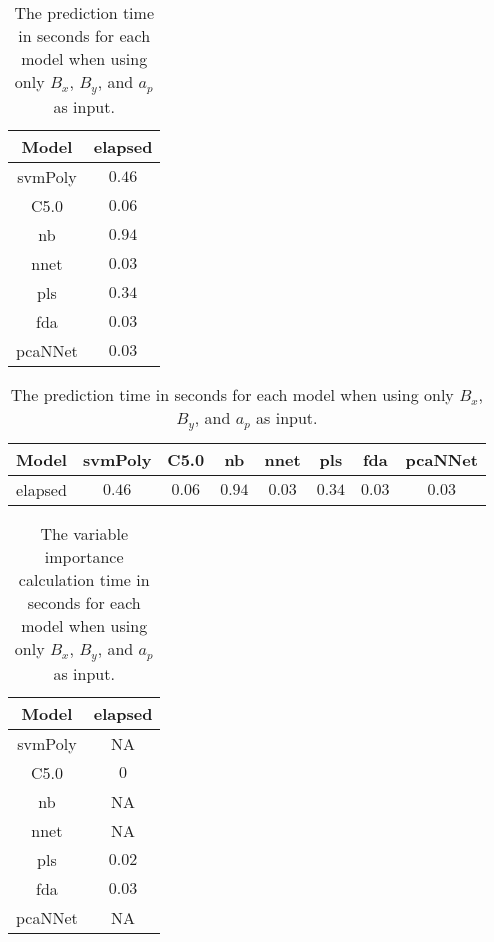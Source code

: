 \begin{table}[!ht]
	\centering
	\begin{tabular}{|c|c|}
		\hline
		Model & elapsed \\ \hline
		svmPoly & $0.46$ \\ \hline
		C5.0 & $0.06$ \\ \hline
		nb & $0.94$ \\ \hline
		nnet & $0.03$ \\ \hline
		pls & $0.34$ \\ \hline
		fda & $0.03$ \\ \hline
		pcaNNet & $0.03$ \\ \hline
	\end{tabular}
	\caption{The prediction time in seconds for each model when using only $B_{x}$, $B_{y}$, and $a_{p}$ as input.}
	\label{tab:time:xyap:predict}
\end{table}

\begin{table}[!ht]
	\centering
	\begin{tabular}{|c|c|c|c|c|c|c|c|}
		\hline
		Model & svmPoly & C5.0 & nb & nnet & pls & fda & pcaNNet \\ \hline
		elapsed & $0.46$ & $0.06$ & $0.94$ & $0.03$ & $0.34$ & $0.03$ & $0.03$ \\ \hline
	\end{tabular}
	\caption{The prediction time in seconds for each model when using only $B_{x}$, $B_{y}$, and $a_{p}$ as input.}
	\label{tab:time:reverse:xyap:predict}
\end{table}

\begin{table}[!ht]
	\centering
	\begin{tabular}{|c|c|}
		\hline
		Model & elapsed \\ \hline
		svmPoly & NA \\ \hline
		C5.0 & $0$ \\ \hline
		nb & NA \\ \hline
		nnet & NA \\ \hline
		pls & $0.02$ \\ \hline
		fda & $0.03$ \\ \hline
		pcaNNet & NA \\ \hline
	\end{tabular}
	\caption{The variable importance calculation time in seconds for each model when using only $B_{x}$, $B_{y}$, and $a_{p}$ as input.}
	\label{tab:time:xyap:importance}
\end{table}

